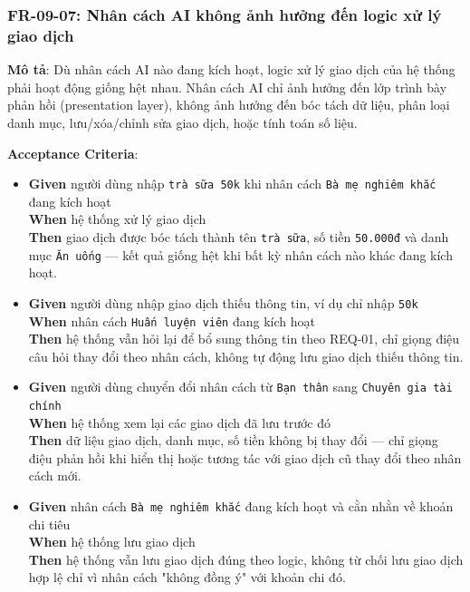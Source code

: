 \subsubsection{FR-09-07: Nhân cách AI không ảnh hưởng đến logic xử lý giao dịch}

\textbf{Mô tả}: Dù nhân cách AI nào đang kích hoạt, logic xử lý giao dịch của hệ thống phải hoạt động giống hệt nhau. Nhân cách AI chỉ ảnh hưởng đến lớp trình bày phản hồi (presentation layer), không ảnh hưởng đến bóc tách dữ liệu, phân loại danh mục, lưu/xóa/chỉnh sửa giao dịch, hoặc tính toán số liệu.



\textbf{Acceptance Criteria}:

\begin{itemize}
\item \textbf{Given} người dùng nhập \texttt{trà sữa 50k} khi nhân cách \texttt{Bà mẹ nghiêm khắc} đang kích hoạt  \\ \hspace*{1.5em}  \textbf{When} hệ thống xử lý giao dịch  \\ \hspace*{1.5em}  \textbf{Then} giao dịch được bóc tách thành tên \texttt{trà sữa}, số tiền \texttt{50.000đ} và danh mục \texttt{Ăn uống} — kết quả giống hệt khi bất kỳ nhân cách nào khác đang kích hoạt.
\item \textbf{Given} người dùng nhập giao dịch thiếu thông tin, ví dụ chỉ nhập \texttt{50k}  \\ \hspace*{1.5em}  \textbf{When} nhân cách \texttt{Huấn luyện viên} đang kích hoạt  \\ \hspace*{1.5em}  \textbf{Then} hệ thống vẫn hỏi lại để bổ sung thông tin theo REQ-01, chỉ giọng điệu câu hỏi thay đổi theo nhân cách, không tự động lưu giao dịch thiếu thông tin.
\item \textbf{Given} người dùng chuyển đổi nhân cách từ \texttt{Bạn thân} sang \texttt{Chuyên gia tài chính}  \\ \hspace*{1.5em}  \textbf{When} hệ thống xem lại các giao dịch đã lưu trước đó  \\ \hspace*{1.5em}  \textbf{Then} dữ liệu giao dịch, danh mục, số tiền không bị thay đổi — chỉ giọng điệu phản hồi khi hiển thị hoặc tương tác với giao dịch cũ thay đổi theo nhân cách mới.
\item \textbf{Given} nhân cách \texttt{Bà mẹ nghiêm khắc} đang kích hoạt và cằn nhằn về khoản chi tiêu  \\ \hspace*{1.5em}  \textbf{When} hệ thống lưu giao dịch  \\ \hspace*{1.5em}  \textbf{Then} hệ thống vẫn lưu giao dịch đúng theo logic, không từ chối lưu giao dịch hợp lệ chỉ vì nhân cách "không đồng ý" với khoản chi đó.

\end{itemize}
